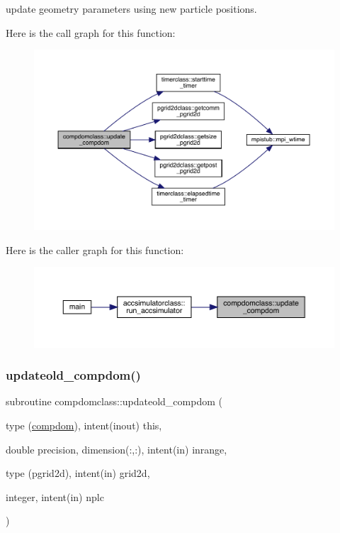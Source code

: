 update geometry parameters using new particle positions. 

Here is the call graph for this function\+:\nopagebreak
\begin{figure}[H]
\begin{center}
\leavevmode
\includegraphics[width=350pt]{namespacecompdomclass_a0e7d562b378f77e0d3a14b33168cb46b_cgraph}
\end{center}
\end{figure}
Here is the caller graph for this function\+:\nopagebreak
\begin{figure}[H]
\begin{center}
\leavevmode
\includegraphics[width=350pt]{namespacecompdomclass_a0e7d562b378f77e0d3a14b33168cb46b_icgraph}
\end{center}
\end{figure}
\mbox{\label{namespacecompdomclass_abf3eab7526c06e30b574ddf8be378826}} 
\subsubsection{\texorpdfstring{updateold\_compdom()}{updateold\_compdom()}}
{\footnotesize\ttfamily subroutine compdomclass\+::updateold\+\_\+compdom (\begin{DoxyParamCaption}\item[{type (\mbox{\hyperlink{namespacecompdomclass_structcompdomclass_1_1compdom}{compdom}}), intent(inout)}]{this,  }\item[{double precision, dimension(\+:,\+:), intent(in)}]{inrange,  }\item[{type (pgrid2d), intent(in)}]{grid2d,  }\item[{integer, intent(in)}]{nplc }\end{DoxyParamCaption})}



